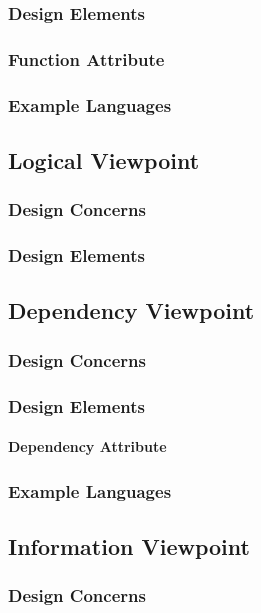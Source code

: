 \documentclass[letterpaper,10pt,titlepage,draftclsnofoot,onecolumn,onesided] {IEEEtran}
\begin{document}
\subsubsection{Design Elements}
\subsubsection{Function Attribute}
\subsubsection{Example Languages}

\subsection{Logical Viewpoint}
\subsubsection{Design Concerns}
\subsubsection{Design Elements}

\subsection{Dependency Viewpoint}
\subsubsection{Design Concerns}
\subsubsection{Design Elements}
\paragraph{Dependency Attribute}
\subsubsection{Example Languages}

\subsection{Information Viewpoint}
\subsubsection{Design Concerns}
\end{document}
